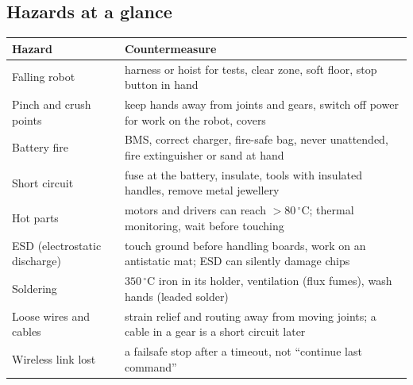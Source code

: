 \subsection*{Hazards at a glance}
\begin{center}
\renewcommand{\arraystretch}{1.25}
\begin{tabular}{p{3.2cm}p{9.5cm}}
\textbf{Hazard} & \textbf{Countermeasure}\\ \hline
Falling robot & harness or hoist for tests, clear zone, soft floor, stop button in hand\\
Pinch and crush points & keep hands away from joints and gears, switch off power for work on the robot, covers\\
Battery fire & BMS, correct charger, fire-safe bag, never unattended, fire extinguisher or sand at hand\\
Short circuit & fuse at the battery, insulate, tools with insulated handles, remove metal jewellery\\
Hot parts & motors and drivers can reach $>80\,^\circ$C; thermal monitoring, wait before touching\\
ESD (electrostatic discharge) & touch ground before handling boards, work on an antistatic mat; ESD can silently damage chips\\
Soldering & $350\,^\circ$C iron in its holder, ventilation (flux fumes), wash hands (leaded solder)\\
Loose wires and cables & strain relief and routing away from moving joints; a cable in a gear is a short circuit later\\
Wireless link lost & a failsafe stop after a timeout, not ``continue last command''\\
\end{tabular}
\end{center}

